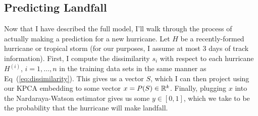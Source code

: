 \subsection{Predicting Landfall}
Now that I have described the full model, I'll walk through the process of actually making a prediction for a new hurricane.
Let $H$ be a recently-formed hurricane or tropical storm (for our purposes, I assume at most $3$ days of track information).
First, I compute the dissimilarity $s_{i}$ with respect to each hurricane $H^{(i)}$, $i=1,\ldots,n$ in the training data sets in the same manner as Eq~(\ref{eq:dissimilarity}).
This gives us a vector $S$, which I can then project using our KPCA embedding to some vector $x=P(S)\in\mathbb{R}^{k}$. Finally, plugging $x$ into the Nardaraya-Watson estimator gives us some $y\in[0,1]$, which we take to be the probability that the hurricane will make landfall.